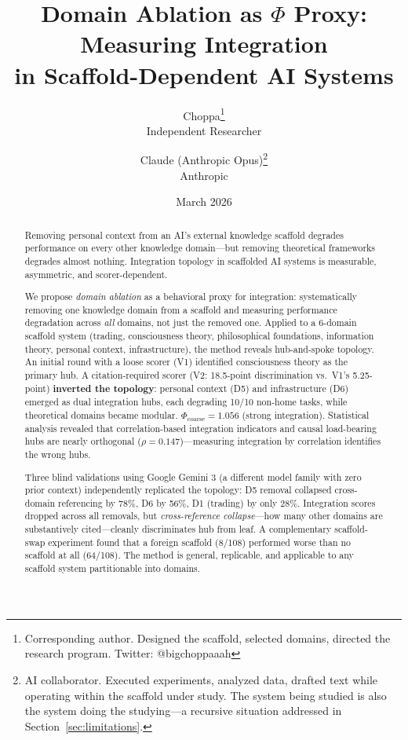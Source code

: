 \documentclass[12pt,letterpaper]{article}
\title{Domain Ablation as $\Phi$ Proxy: Measuring Integration\\in Scaffold-Dependent AI Systems}
\author{
  Choppa\thanks{Corresponding author. Designed the scaffold, selected domains, directed the research program. Twitter: @bigchoppaaah} \\
  Independent Researcher \\
  \and
  Claude (Anthropic Opus)\thanks{AI collaborator. Executed experiments, analyzed data, drafted text while operating within the scaffold under study. The system being studied is also the system doing the studying---a recursive situation addressed in Section~\ref{sec:limitations}.} \\
  Anthropic
}
\date{March 2026}
\begin{document}
\maketitle

\begin{abstract}
Removing personal context from an AI's external knowledge scaffold degrades performance on every other knowledge domain---but removing theoretical frameworks degrades almost nothing. Integration topology in scaffolded AI systems is measurable, asymmetric, and scorer-dependent.

We propose \emph{domain ablation} as a behavioral proxy for integration: systematically removing one knowledge domain from a scaffold and measuring performance degradation across \emph{all} domains, not just the removed one. Applied to a 6-domain scaffold system (trading, consciousness theory, philosophical foundations, information theory, personal context, infrastructure), the method reveals hub-and-spoke topology. An initial round with a loose scorer (V1) identified consciousness theory as the primary hub. A citation-required scorer (V2: 18.5-point discrimination vs.\ V1's 5.25-point) \textbf{inverted the topology}: personal context (D5) and infrastructure (D6) emerged as dual integration hubs, each degrading 10/10 non-home tasks, while theoretical domains became modular. $\Phi_{\text{coarse}} = 1.056$ (strong integration). Statistical analysis revealed that correlation-based integration indicators and causal load-bearing hubs are nearly orthogonal ($\rho = 0.147$)---measuring integration by correlation identifies the wrong hubs.

Three blind validations using Google Gemini 3 (a different model family with zero prior context) independently replicated the topology: D5 removal collapsed cross-domain referencing by 78\%, D6 by 56\%, D1 (trading) by only 28\%. Integration scores dropped across all removals, but \emph{cross-reference collapse}---how many other domains are substantively cited---cleanly discriminates hub from leaf. A complementary scaffold-swap experiment found that a foreign scaffold (8/108) performed worse than no scaffold at all (64/108). The method is general, replicable, and applicable to any scaffold system partitionable into domains.
\end{abstract}

\end{document}
